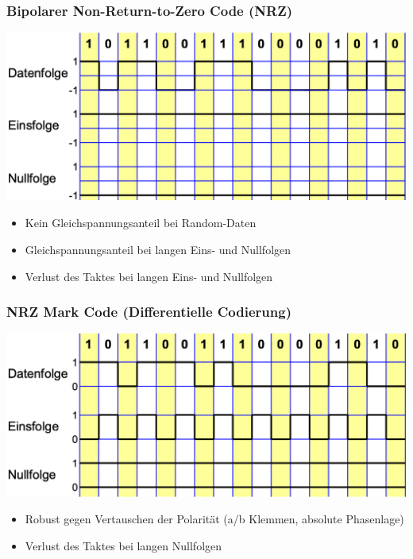 \subsubsection{Bipolarer Non-Return-to-Zero Code (NRZ)}
\begin{center}
    \includegraphics[width=\linewidth]{graphic/signale_analyisieren/Bipolarer Non-Return-to-Zero Code (NRZ).png}
\end{center}
\vspace{-8pt}
\begin{itemize}
    \item Kein Gleichspannungsanteil bei Random-Daten
    \item Gleichspannungsanteil bei langen Eins- und Nullfolgen
    \item Verlust des Taktes bei langen Eins- und Nullfolgen
\end{itemize}


\subsubsection{NRZ Mark Code  (Differentielle Codierung)}
\begin{center}
    \includegraphics[width=\linewidth]{graphic/signale_analyisieren/NRZ Mark Code Differentielle Codierung.png}
\end{center}
\vspace{-8pt}
\begin{itemize}
    \item Robust gegen Vertauschen der Polarität (a/b Klemmen, absolute Phasenlage)
    \item Verlust des Taktes bei langen Nullfolgen
\end{itemize}


